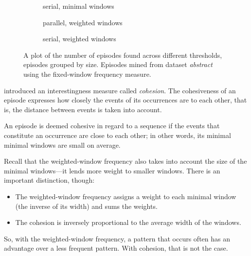 \begin{figure}
\begin{subfigure}[b]{0.5\textwidth}
\begin{tikzpicture}[scale=0.65]
\end{tikzpicture}
\caption{serial, minimal windows}
\label{fig:episode-frequencies-by-size-serial-mwi}
\end{subfigure}
\begin{subfigure}[b]{0.5\textwidth}
\centering
{}
\caption{parallel, weighted windows}
\label{fig:episode-frequencies-by-size-serial-wwi}
\end{subfigure}
\begin{subfigure}[b]{0.5\textwidth}
\centering
{}
\caption{serial, weighted windows}
\label{fig:episode-frequencies-by-size-serial-wwi}
\end{subfigure}
\caption{A plot of the number of episodes found across different thresholds, episodes grouped by size. Episodes mined from dataset \emph{abstract} using the fixed-window frequency measure.}
\label{fig:episode-frequencies-by-size}
\end{figure}
\citep{cule2016efficient} introduced an interestingness measure called \emph{cohesion}. The cohesiveness of an episode expresses how closely the events of its occurrences are to each other, that is, the distance between events is taken into account.

An episode is deemed cohesive in regard to a sequence if the events that constitute an occurrence are close to each other; in other words, its minimal minimal windows are small on average.

Recall that the weighted-window frequency also takes into account the size of the minimal windows---it lends more weight to smaller windows. There is an important distinction, though:
\begin{itemize}
\item The weighted-window frequency assigns a weight to each minimal window (the inverse of its width) and sums the weights.
\item The cohesion is inversely proportional to the average width of the windows.
\end{itemize}

So, with the weighted-window frequency, a pattern that occurs often has an advantage over a less frequent pattern. With cohesion, that is not the case.

